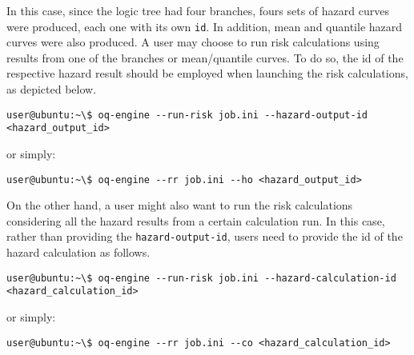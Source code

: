 In this case, since the logic tree had four branches, fours sets of hazard
curves were produced, each one with its own \verb+id+. In addition, mean and
quantile hazard curves were also produced. A user may choose to run risk
calculations using results from one of the branches or mean/quantile curves.
To do so, the id of the respective hazard result should be employed when
launching the risk calculations, as depicted below.

\begin{Verbatim}[frame=single, commandchars=\\\{\}, samepage=true]
user@ubuntu:~\$ oq-engine --run-risk job.ini --hazard-output-id
<hazard_output_id>
\end{Verbatim}

or simply:

\begin{Verbatim}[frame=single, commandchars=\\\{\}, samepage=true]
user@ubuntu:~\$ oq-engine --rr job.ini --ho <hazard_output_id>
\end{Verbatim}

On the other hand, a user might also want to run the risk calculations
considering all the hazard results from a certain calculation run. In this
case, rather than providing the \verb+hazard-output-id+, users need to provide
the id of the hazard calculation as follows.

\begin{Verbatim}[frame=single, commandchars=\\\{\}, samepage=true]
user@ubuntu:~\$ oq-engine --run-risk job.ini --hazard-calculation-id
<hazard_calculation_id>
\end{Verbatim}

or simply:

\begin{Verbatim}[frame=single, commandchars=\\\{\}, samepage=true]
user@ubuntu:~\$ oq-engine --rr job.ini --co <hazard_calculation_id>
\end{Verbatim}